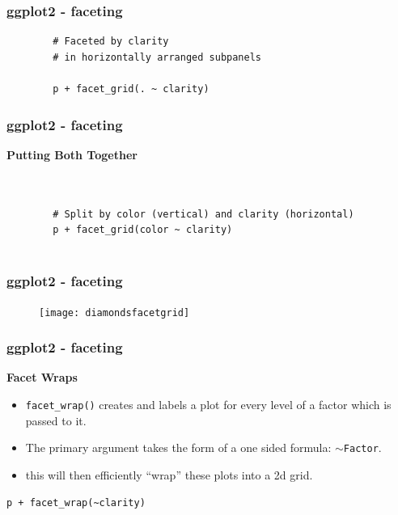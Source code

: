 \documentclass{beamer}
\begin{document}
\begin{frame}[fragile]
	\frametitle{ggplot2 - faceting}
	
	\begin{framed}
		\begin{verbatim}
		# Faceted by clarity
		# in horizontally arranged subpanels
		
		p + facet_grid(. ~ clarity)
		\end{verbatim}
	\end{framed}
\end{frame}
\begin{frame}[fragile]
	\frametitle{ggplot2 - faceting}
	
\noindent	\textbf{Putting Both Together}
	\begin{framed}
		\begin{verbatim}
		
		
		# Split by color (vertical) and clarity (horizontal)
		p + facet_grid(color ~ clarity)
		
		\end{verbatim}
	\end{framed}
\end{frame}
\begin{frame}[fragile]
	\frametitle{ggplot2 - faceting}

	\begin{figure}
\centering
\texttt{[image: diamondsfacetgrid]}

\end{figure}

\end{frame}
\begin{frame}[fragile]
	\frametitle{ggplot2 - faceting}
	\large
\noindent \textbf{Facet Wraps}
\begin{itemize}
\item \texttt{facet\_wrap()} creates and labels a plot for every level of a factor which is passed to it.
\item The primary argument takes the form of a one sided formula: $\sim$\texttt{Factor}.
\item this will then efficiently ``wrap” these plots into a 2d grid.
\end{itemize}
\begin{framed}
\begin{verbatim}
p + facet_wrap(~clarity)
\end{verbatim}
\end{framed}
\end{frame}
\end{document}
